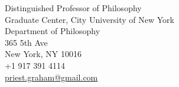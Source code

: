 {Distinguished Professor of Philosophy
	\\ Graduate Center, City University of New York 
	\\ Department of Philosophy 
	\\ 365 5th Ave
	\\ New York, NY 10016
	\\ +1 917 391 4114
	\\ \href{mailto:priest.graham@gmail.com }{priest.graham@gmail.com}}
